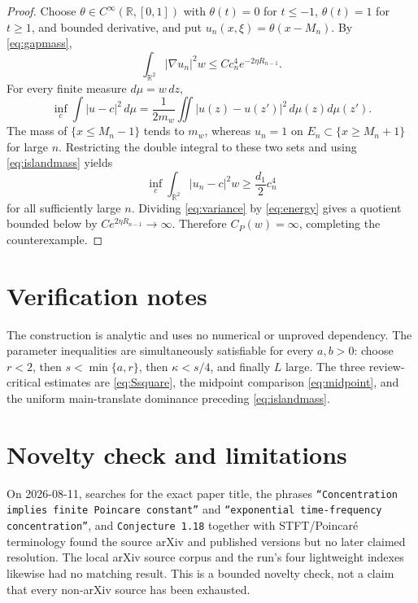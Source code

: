 \documentclass[11pt]{article}
\newcommand{\R}{\mathbb R}
\begin{document}
\begin{proof}
Choose \(\theta\in C^\infty(\R,[0,1])\) with
\(\theta(t)=0\) for \(t\le-1\), \(\theta(t)=1\) for \(t\ge1\), and bounded
derivative, and put \(u_n(x,\xi)=\theta(x-M_n)\).  By
\eqref{eq:gapmass},
\begin{equation}\label{eq:energy}
 \int_{\R^2}|\nabla u_n|^2w
 \le Cc_n^4e^{-2\eta R_{n-1}}.
\end{equation}
For every finite measure \(d\mu=w\,dz\),
\[
 \inf_c\int|u-c|^2\,d\mu
 =\frac1{2m_w}\iint|u(z)-u(z')|^2\,d\mu(z)d\mu(z').
\]
The mass of \(\{x\le M_n-1\}\) tends to \(m_w\), whereas \(u_n=1\) on
\(E_n\subset\{x\ge M_n+1\}\) for large \(n\).  Restricting the double integral
to these two sets and using \eqref{eq:islandmass} yields
\begin{equation}\label{eq:variance}
 \inf_c\int_{\R^2}|u_n-c|^2w\ge \frac{d_1}{2}c_n^4
\end{equation}
for all sufficiently large \(n\).  Dividing \eqref{eq:variance} by
\eqref{eq:energy} gives a quotient bounded below by
\(Ce^{2\eta R_{n-1}}\to\infty\).  Therefore \(C_P(w)=\infty\), completing
the counterexample.
\end{proof}

\section*{Verification notes}

The construction is analytic and uses no numerical or unproved dependency.
The parameter inequalities are simultaneously satisfiable for every
\(a,b>0\): choose \(r<2\), then \(s<\min\{a,r\}\), then
\(\kappa<s/4\), and finally \(L\) large.  The three review-critical estimates
are \eqref{eq:Ssquare}, the midpoint comparison \eqref{eq:midpoint}, and the
uniform main-translate dominance preceding \eqref{eq:islandmass}.

\section*{Novelty check and limitations}

On 2026-08-11, searches for the exact paper title, the phrases
\texttt{``Concentration implies finite Poincare constant''} and
\texttt{``exponential time-frequency concentration''}, and
\texttt{Conjecture 1.18} together with STFT/Poincar\'e terminology found the
source arXiv and published versions but no later claimed resolution.  The
local arXiv source corpus and the run's four lightweight indexes likewise had
no matching result.  This is a bounded novelty check, not a claim that every
non-arXiv source has been exhausted.
\end{document}
